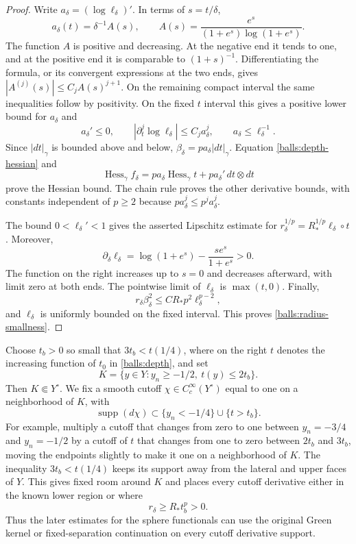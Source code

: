 \documentclass[11pt]{article}
\theoremstyle{definition}
\theoremstyle{remark}
\numberwithin{equation}{section}
\begin{document}
\begin{proof}
Write $a_\delta=(\log\ell_\delta)'$.  In terms of $s=t/\delta$,
\[
 a_\delta(t)=\delta^{-1}A(s),\qquad
 A(s)=\frac{e^s}{(1+e^s)\log(1+e^s)}.
\]
The function $A$ is positive and decreasing.  At the negative end it
tends to one, and at the positive end it is comparable to $(1+s)^{-1}$.
Differentiating the formula, or its convergent expressions at the two
ends, gives $|A^{(j)}(s)|\leq C_jA(s)^{j+1}$.  On the remaining compact
interval the same inequalities follow by positivity.  On the fixed
$t$ interval this gives a positive lower bound for $a_\delta$ and
\[
 a_\delta'\leq0,\qquad
 |\partial_t^j\log\ell_\delta|\leq C_j a_\delta^j,
 \qquad a_\delta\leq\ell_\delta^{-1}.
\]
Since $|dt|_\gamma$ is bounded above and below,
$\beta_\delta=p a_\delta|dt|_\gamma$.  Equation
\eqref{balls:depth-hessian} and
\[
 \operatorname{Hess}_\gamma f_\delta
   =p a_\delta\operatorname{Hess}_\gamma t
          +p a_\delta'\,dt\otimes dt
\]
prove the Hessian bound.  The chain rule proves the other derivative
bounds, with constants independent of $p\geq2$ because
$p a_\delta^j\leq p^j a_\delta^j$.

The bound $0<\ell_\delta'<1$ gives the asserted Lipschitz estimate for
$r_\delta^{1/p}=R_*^{1/p}\ell_\delta\circ t$.  Moreover,
\[
 \partial_\delta\ell_\delta
  =\log(1+e^s)-\frac{s e^s}{1+e^s}>0.
\]
The function on the right increases up to $s=0$ and decreases afterward,
with limit zero at both ends.  The pointwise limit of $\ell_\delta$ is
$\max(t,0)$.  Finally,
\[
 r_\delta\beta_\delta^2
       \leq C R_*p^2\ell_\delta^{p-2},
\]
and $\ell_\delta$ is uniformly bounded on the fixed interval.  This
proves \eqref{balls:radius-smallness}.
\end{proof}

Choose $t_b>0$ so small that $3t_b<t(1/4)$, where on the right $t$ denotes
the increasing function of $t_0$ in \eqref{balls:depth}, and set
\begin{equation}\label{balls:K}
 K=\{y\in Y:y_n\geq-1/2,\ t(y)\leq2t_b\}.
\end{equation}
Then $K\Subset Y^\circ$.  We fix a smooth cutoff $\chi\in
C_c^\infty(Y^\circ)$ equal to one on a neighborhood of $K$, with
\begin{equation}\label{balls:cutoff-region}
 \operatorname{supp}(d\chi)\subset
       \{y_n<-1/4\}\cup\{t>t_b\}.
\end{equation}
For example, multiply a cutoff that changes from zero to one between
$y_n=-3/4$ and $y_n=-1/2$ by a cutoff of $t$ that changes from one to zero
between $2t_b$ and $3t_b$, moving the endpoints slightly to make it one
on a neighborhood of $K$.  The inequality $3t_b<t(1/4)$ keeps its support
away from the lateral and upper faces of $Y$.  This gives fixed room
around $K$ and places every cutoff derivative either in the known lower
region or where
\[
 r_\delta\ge R_*t_b^p>0.
\]
Thus the later estimates for the sphere functionals can use the original
Green kernel or fixed-separation continuation on every cutoff derivative
support.
\end{document}
